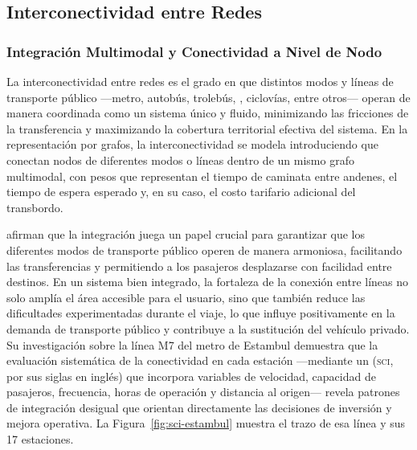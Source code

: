 
\subsection{Interconectividad entre Redes}
\label{subsec:interconectividad}

\subsubsection{Integración Multimodal y Conectividad a Nivel de Nodo}
\label{subsubsec:integracion-multimodal}

La interconectividad entre redes es el grado en que distintos modos y líneas de
transporte público ---metro, autobús, trolebús, \brt{}, ciclovías, entre
otros--- operan de manera coordinada como un sistema único y fluido, minimizando
las fricciones de la transferencia y maximizando la cobertura territorial
efectiva del sistema. En la representación por grafos, la interconectividad se
modela introduciendo  que conectan nodos de
diferentes modos o líneas dentro de un mismo grafo multimodal, con pesos que
representan el tiempo de caminata entre andenes, el tiempo de espera esperado y,
en su caso, el costo tarifario adicional del transbordo.

\citet{ugur2025} afirman que la integración juega un papel crucial para
garantizar que los diferentes modos de transporte público operen de manera
armoniosa, facilitando las transferencias y permitiendo a los pasajeros
desplazarse con facilidad entre destinos. En un sistema bien integrado, la
fortaleza de la conexión entre líneas no solo amplía el área accesible para el
usuario, sino que también reduce las dificultades experimentadas durante el
viaje, lo que influye positivamente en la demanda de transporte público y
contribuye a la sustitución del vehículo privado. Su investigación sobre la
línea M7 del metro de Estambul demuestra que la evaluación sistemática de la
conectividad en cada estación ---mediante un
 (\textsc{sci}, por sus siglas en
inglés) que incorpora variables de velocidad, capacidad de pasajeros,
frecuencia, horas de operación y distancia al origen--- revela patrones de
integración desigual que orientan directamente las decisiones de inversión y
mejora operativa. La Figura~\ref{fig:sci-estambul} muestra el trazo de esa
línea y sus 17 estaciones.

